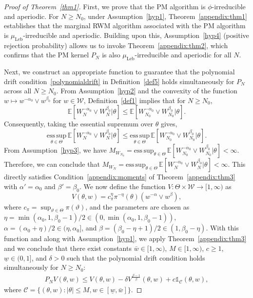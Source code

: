 \documentclass[pdflatex,sn-mathphys-num]{sn-jnl}
\newcommand{\E}{\mathbb{E}}
\newcommand{\ind}{\mathds{1}}
\renewcommand{\geq}{\geqslant}
\renewcommand{\leq}{\leqslant}
\theoremstyle{thmstyleone}
\theoremstyle{thmstyletwo}
\theoremstyle{thmstylethree}
\begin{document}
\begin{proof}[Proof of Theorem~{\upshape\ref{thm1}}]
First, we prove that the PM algorithm is $\phi$-irreducible and aperiodic. For $N\geq N_0$, under Assumption~\ref{hyp1}, Theorem~\ref{appendix:thm1} establishes that the marginal RWM algorithm associated with the PM algorithm is $\mu_{\text{Leb}}$-irreducible and aperiodic. Building upon this, Assumption~\ref{hyp4} (positive rejection probability) allows us to invoke Theorem~\ref{appendix:thm2}, which confirms that the PM kernel $P_N$ is also $\mu_{\text{Leb}}$-irreducible and aperiodic for all $N$. 

Next, we construct an appropriate function to guarantee that the polynomial drift condition~\eqref{polynomialdrift} in Definition~\ref{def5} holds simultaneously for $P_N$ across all $N \geq N_0$. From Assumption~\ref{hyp2} and the convexity of the function $w \mapsto w^{-\alpha_{0}} \vee w^{\beta_{0}}$ for $w \in \mathcal{W}$, Definition~\ref{def1} implies that for $N \ge N_0$,
\[
\E[W_N^{-\alpha_{0}} \vee W_N^{\beta_{0}}|\theta]  \leq \E[W_{N_0}^{-\alpha_{0}} \vee W_{N_0}^{\beta_{0}}|\theta].
\]
Consequently, taking the essential supremum over $\theta$ gives,
\[
\underset{\theta \in \Theta}{\mathrm{ess\,sup}}\,  \E[W_N^{-\alpha_{0}} \vee W_N^{\beta_{0}}|\theta]  \leq \underset{\theta \in \Theta}{\mathrm{ess\,sup}}\,  \E[W_{N_0}^{-\alpha_{0}} \vee W_{N_0}^{\beta_{0}}|\theta].
\]
From Assumption~\ref{hyp3}, we have $M_{W_{N_0}}=  {\mathrm{ess\,sup} }_{\theta \in \Theta}\, \E[W_{N_0}^{-\alpha_{0}} \vee W_{N_0}^{\beta_{0}}|\theta] <  \infty$.
Therefore, we can conclude that $M_{W_N} = {\mathrm{ess\,sup} }_{\theta \in \Theta}\,  \E[W_N^{-\alpha_{0}} \vee W_N^{\beta_{0}}|\theta]  < \infty$. This directly satisfies Condition~\eqref{appendix:moments} of Theorem~\ref{appendix:thm3} with $\alpha'=\alpha_{0}$ and $\beta'=\beta_{0}$. We now define the function $V : \Theta \times \mathcal{W} \to [1, \infty)$ as
\[
V(\theta, w) = c_\pi^{\eta}\pi^{-\eta}(\theta) (w^{-\alpha} \vee w^{\beta}),
\]
where $c_\pi ={\sup}_{\vartheta \in \Theta} \pi(\vartheta)$, and the parameters are chosen as $\eta = \min(\alpha_{0},1,\beta_{0}-1)/2 \in (0, \min(\alpha_{0},1,\beta_{0}-1))$, $\alpha = (\alpha_{0}+\eta)/2 \in (\eta, \alpha_{0}]$, and $\beta = (\beta_{0}-\eta+1)/2 \in (1, \beta_{0}-\eta)$. With this function and along with Assumption~\ref{hyp1}, we apply Theorem~\ref{appendix:thm3} and we conclude that there exist constants $\bar{w} \in [1, \infty)$, $M \in [1, \infty)$, $c \geq 1$, $\underline{w} \in (0,1]$, and $\delta>0$ such that the polynomial drift condition holds simultaneously for $N \geq N_0$:
\begin{align}
    P_N V(\theta, w) \leq V(\theta, w) - \delta V^{\frac{\beta-1}{\beta}}(\theta, w) + c\ind_\mathcal{C}(\theta, w),
    \label{polydrift}
\end{align}
where $\mathcal{C} =\{(\theta, w) : |\theta|\leq M, w\in [\underline{w}, \bar{w}]\}$. 



\end{proof}
\end{document}
